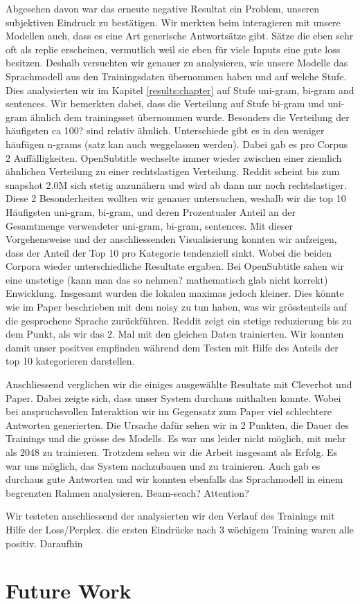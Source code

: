 Abgesehen davon war das erneute negative Resultat ein Problem, unseren subjektiven Eindruck zu bestätigen. Wir merkten beim interagieren mit unsere Modellen auch, dass es eine Art generische Antwortsätze gibt. Sätze die eben sehr oft als replie erscheinen, vermutlich weil sie eben für viele Inputs eine gute loss besitzen. Deshalb versuchten wir genauer zu analysieren, wie unsere Modelle das Sprachmodell aus den Trainingsdaten übernommen haben und auf welche Stufe. Dies analysierten wir im Kapitel \ref{results:chapter} auf Stufe uni-gram, bi-gram and sentences. Wir bemerkten dabei, dass die Verteilung auf Stufe bi-gram und uni-gram ähnlich dem trainingsset übernommen wurde. Besonders die Verteilung der häufigsten ca 100? sind relativ ähnlich. Unterschiede gibt es in den weniger häufügen n-grams (satz kan auch weggelassen werden). Dabei gab es pro Corpus 2 Auffälligkeiten. OpenSubtitle wechselte immer wieder zwischen einer ziemlich ähnlichen Verteilung zu einer rechtslastigen Verteilung. Reddit scheint bis zum snapshot 2.0M sich stetig anzunähern und wird ab dann nur noch rechtslastiger. Diese 2 Besonderheiten wollten wir genauer untersuchen, weshalb wir die top 10 Häufigsten uni-gram, bi-gram, und deren Prozentualer Anteil an der Gesamtmenge verwendeter uni-gram, bi-gram, sentences. Mit dieser Vorgehensweise und der anschliessenden Visualisierung konnten wir aufzeigen, dass der Anteil der Top 10 pro Kategorie tendenziell sinkt. Wobei die beiden Corpora wieder unterschiedliche Resultate ergaben. Bei OpenSubtitle sahen wir eine unstetige (kann man das so nehmen? mathematisch glab nicht korrekt) Enwicklung. Insgesamt wurden die lokalen maximas jedoch kleiner. Dies könnte wie im Paper \cite{bibid} beschrieben mit dem noisy zu tun haben, was wir grösstenteils auf die gesprochene Sprache zurückführen. Reddit zeigt ein stetige reduzierung bis zu dem Punkt, als wir das 2. Mal mit den gleichen Daten trainierten. Wir konnten damit unser positves empfinden während dem Testen mit Hilfe des Anteils der top 10 kategorieren darstellen.

Anschliessend verglichen wir die einiges ausgewählte Resultate mit Cleverbot und Paper. Dabei zeigte sich, dass unser System durchaus mithalten konnte. Wobei bei anspruchsvollen Interaktion wir im Gegensatz zum Paper viel schlechtere Antworten generierten. Die Ursache dafür sehen wir in 2 Punkten, die Dauer des Trainings und die grösse des Modells. Es war uns leider nicht möglich, mit mehr als 2048 zu trainieren. Trotzdem sehen wir die Arbeit insgesamt als Erfolg. Es war uns möglich, das System nachzubauen und zu trainieren. Auch gab es durchaus gute Antworten und wir konnten ebenfalls das Sprachmodell in einem begrenzten Rahmen analysieren.
Beam-seach?
Attention?


Wir testeten anschliessend der analysierten wir den Verlauf des Trainings mit Hilfe der Loss/Perplex. die ersten Eindrücke nach 3 wöchigem Training waren alle positiv. Daraufhin
\chapter{Future Work}
\blindtext